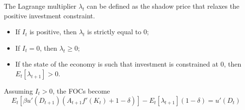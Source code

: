 \documentclass[10pt,math=newtx,citestyle=gb7714-2015,bibstyle=gb7714-2015]{elegantbook}
\begin{document}
The Lagrange multiplier $\lambda_t$ can be defined as the shadow price that relaxes the positive investment constraint.
\begin{itemize}
	\item If $I_t$ is positive, then $\lambda_t$ is strictly equal to 0;
	\item If $I_t=0$, then $\lambda_t\ge0$;
	\item If the state of the economy is such that investment is constrained at 0, then $E_t[\lambda_{t+1}]>0$.
	\end{itemize}

Assuming $I_t>0$, the FOCs become
\begin{equation}\label{label}
	E_t\left[\beta u'(D_{t+1})(A_{t+1}f'(K_t)+1-\delta)\right]-E_t[\lambda_{t+1}](1-\delta)=u'(D_t)
\end{equation}
\end{document}
